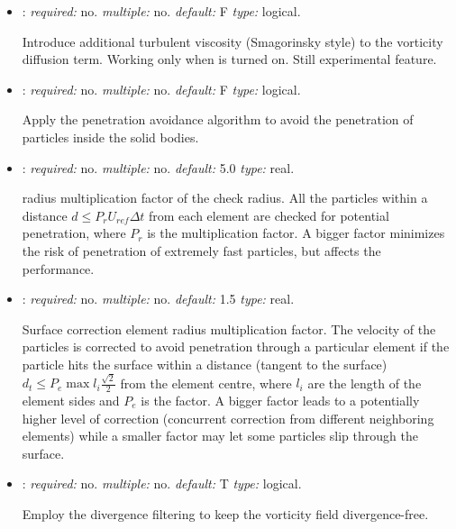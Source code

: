 \begin{itemize}
Calculate the evolution of vorticity of the particles considering the vorticity diffusion

\item {}: \textit{required:} no. \textit{multiple:} no. 
\textit{default:} F \textit{type:} logical.

Introduce additional turbulent viscosity (Smagorinsky style) to the vorticity 
diffusion term. Working only when  is turned on. Still experimental feature. 

\item {}: \textit{required:} no. \textit{multiple:} no. 
\textit{default:} F \textit{type:} logical.

Apply the penetration avoidance algorithm to avoid the penetration of particles 
inside the solid bodies.

\item {}: \textit{required:} no. 
\textit{multiple:} no. \textit{default:} 5.0 \textit{type:} real.

radius multiplication factor of the check radius. All the particles within a 
distance $d\leq P_r U_{ref} \Delta t$ from each element are checked for 
potential penetration, where $P_r$ is the multiplication factor. 
A bigger factor minimizes the risk of penetration of extremely fast particles, 
but affects the performance. 

\item {}: \textit{required:} no. 
\textit{multiple:} no. \textit{default:} 1.5 \textit{type:} real.

Surface correction element radius multiplication factor.
The velocity of the particles is corrected to avoid penetration through a 
particular element if the particle hits the surface within a distance 
(tangent to the surface) $d_t \leq P_e \max{l_i} \frac{\sqrt{2}}{2}$ 
from the element centre, where $l_i$ are the length of the element sides 
and $P_e$ is the factor. 
A bigger factor leads to a potentially higher level of correction 
(concurrent correction from different neighboring elements) 
while a smaller factor may let some particles slip through the surface. 

\item {}: \textit{required:} no. \textit{multiple:} no. 
\textit{default:} T \textit{type:} logical.

Employ the divergence filtering to keep the vorticity field divergence-free. 


\end{itemize}
